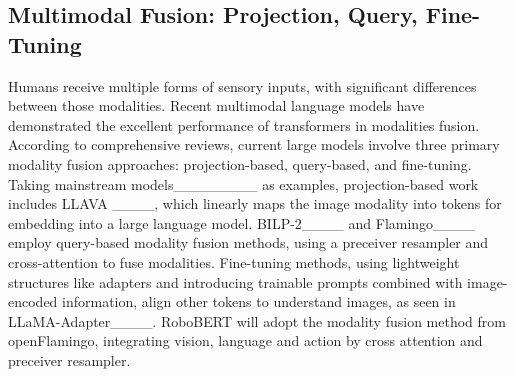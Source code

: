 \subsection{Multimodal Fusion: Projection, Query, Fine-Tuning}
Humans receive multiple forms of sensory inputs, with significant differences between those modalities. Recent multimodal language models have demonstrated the excellent performance of transformers in modalities fusion. According to comprehensive reviews, current large models involve three primary modality fusion approaches: projection-based, query-based, and fine-tuning. Taking mainstream models________ as examples, projection-based work includes LLAVA ____, which linearly maps the image modality into tokens for embedding into a large language model. BILP-2____ and Flamingo____ employ query-based modality fusion methods, using a preceiver resampler and cross-attention to fuse modalities. Fine-tuning methods, using lightweight structures like adapters and introducing trainable prompts combined with image-encoded information, align other tokens to understand images, as seen in LLaMA-Adapter____. RoboBERT  will adopt the modality fusion method from openFlamingo, integrating vision, language and action by cross attention and preceiver resampler.